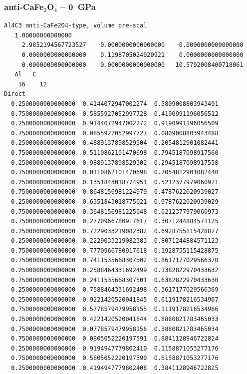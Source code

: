 \subsubsection*{anti-CaFe$_2$O$_4$ -- 0~GPa}
\begin{footnotesize}
\begin{verbatim}
Al4C3 anti-CaFe2O4-type, volume pre-scal
   1.00000000000000     
     2.9852194567723527    0.0000000000000000    0.0000000000000000
     0.0000000000000000    9.1198705024020921    0.0000000000000000
     0.0000000000000000    0.0000000000000000   10.5792008400718061
   Al   C 
    16    12
Direct
  0.2500000000000000  0.4144072947002274  0.5809008803943491
  0.7500000000000000  0.5855927052997728  0.4190991196056512
  0.2500000000000000  0.9144072947002272  0.9190991196056509
  0.7500000000000000  0.0855927052997727  0.0809008803943488
  0.2500000000000000  0.4889137898529304  0.2054812901082441
  0.7500000000000000  0.5110862101470698  0.7945187098917560
  0.2500000000000000  0.9889137898529302  0.2945187098917558
  0.7500000000000000  0.0110862101470698  0.7054812901082440
  0.2500000000000000  0.1351843018774951  0.5212377979060971
  0.7500000000000000  0.8648156981224979  0.4787622020939027
  0.2500000000000000  0.6351843018775021  0.9787622020939029
  0.7500000000000000  0.3648156981225048  0.0212377979060973
  0.7500000000000000  0.2770966780917617  0.3071244884571125
  0.2500000000000000  0.7229033219082382  0.6928755115428877
  0.2500000000000000  0.2229033219082383  0.8071244884571123
  0.7500000000000000  0.7770966780917618  0.1928755115428875
  0.7500000000000000  0.7411535668307502  0.8617177029566370
  0.2500000000000000  0.2588464331692499  0.1382822970433632
  0.7500000000000000  0.2411535668307501  0.6382822970433630
  0.2500000000000000  0.7588464331692498  0.3617177029566369
  0.2500000000000000  0.9221420520041845  0.6119178216534967
  0.7500000000000000  0.5778579479958155  0.1119178216534966
  0.2500000000000000  0.4221420520041844  0.8880821783465033
  0.7500000000000000  0.0778579479958156  0.3880821783465034
  0.7500000000000000  0.0805052220197591  0.8841128946722824
  0.2500000000000000  0.9194947779802410  0.1158871053277176
  0.7500000000000000  0.5805052220197590  0.6158871053277176
  0.2500000000000000  0.4194947779802408  0.3841128946722825
 

\end{verbatim}
\end{footnotesize}
